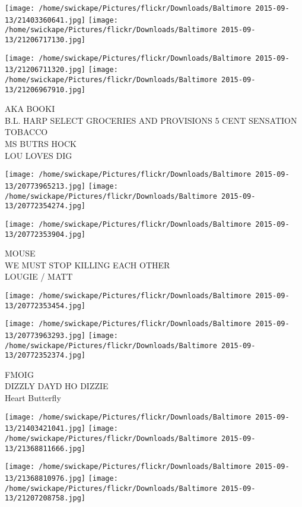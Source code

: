 \documentclass[10pt,letterpaper]{article}
\begin{document}
\texttt{[image: /home/swickape/Pictures/flickr/Downloads/Baltimore 2015-09-13/21403360641.jpg]}
\texttt{[image: /home/swickape/Pictures/flickr/Downloads/Baltimore 2015-09-13/21206717130.jpg]}

\texttt{[image: /home/swickape/Pictures/flickr/Downloads/Baltimore 2015-09-13/21206711320.jpg]}
\texttt{[image: /home/swickape/Pictures/flickr/Downloads/Baltimore 2015-09-13/21206967910.jpg]}

AKA BOOKI\\
B.L. HARP SELECT GROCERIES AND PROVISIONS 5 CENT SENSATION TOBACCO\\
MS BUTRS HOCK\\
LOU LOVES DIG\\
\pagebreak

\texttt{[image: /home/swickape/Pictures/flickr/Downloads/Baltimore 2015-09-13/20773965213.jpg]}
\texttt{[image: /home/swickape/Pictures/flickr/Downloads/Baltimore 2015-09-13/20772354274.jpg]}

\vspace{0.25in}
\texttt{[image: /home/swickape/Pictures/flickr/Downloads/Baltimore 2015-09-13/20772353904.jpg]}

MOUSE\\
WE MUST STOP KILLING EACH OTHER\\
LOUGIE / MATT\\
\pagebreak

\texttt{[image: /home/swickape/Pictures/flickr/Downloads/Baltimore 2015-09-13/20772353454.jpg]}

\vspace{0.25in}
\texttt{[image: /home/swickape/Pictures/flickr/Downloads/Baltimore 2015-09-13/20773963293.jpg]}
\texttt{[image: /home/swickape/Pictures/flickr/Downloads/Baltimore 2015-09-13/20772352374.jpg]}

FMOIG\\
DIZZLY DAYD HO DIZZIE\\
Heart Butterfly\\
\pagebreak

\texttt{[image: /home/swickape/Pictures/flickr/Downloads/Baltimore 2015-09-13/21403421041.jpg]}
\texttt{[image: /home/swickape/Pictures/flickr/Downloads/Baltimore 2015-09-13/21368811666.jpg]}

\texttt{[image: /home/swickape/Pictures/flickr/Downloads/Baltimore 2015-09-13/21368810976.jpg]}
\texttt{[image: /home/swickape/Pictures/flickr/Downloads/Baltimore 2015-09-13/21207208758.jpg]}
\end{document}
